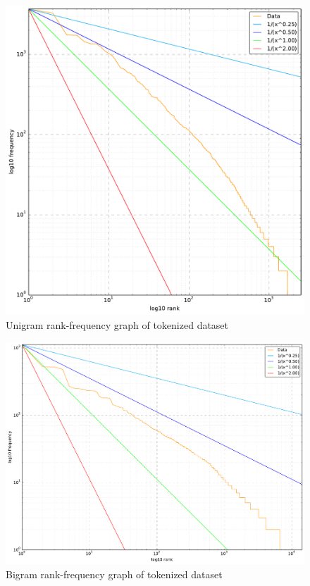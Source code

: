 \begin{figure}[hb]
	\centering
	\includegraphics[width=0.9\linewidth]{figures/frequency-graphs/1-gram}
	\caption{Unigram rank-frequency graph of tokenized dataset}
	\label{fig:rank-frequency-unigram}
\end{figure}

\begin{figure}[ht]
	\centering
	\includegraphics[width=0.9\linewidth]{figures/frequency-graphs/2-gram}
	\caption{Bigram rank-frequency graph of tokenized dataset}
	\label{fig:rank-frequency-bigram}
\end{figure}

